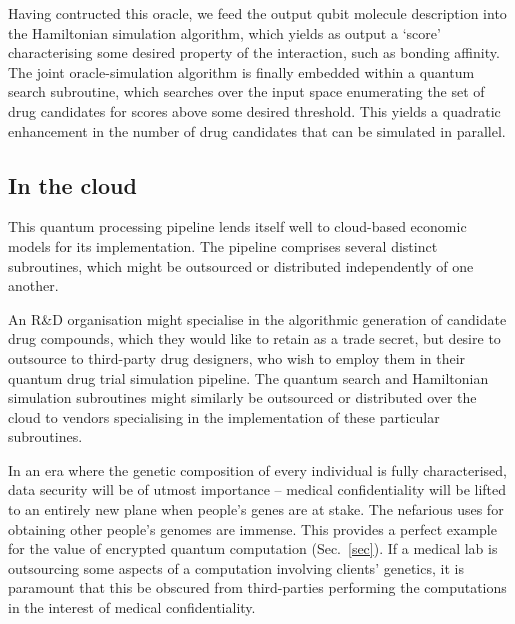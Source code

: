 \documentclass[aps,pra,twocolumn,amsmath,amssymb,nofootinbib,superscriptaddress]{revtex4}
\begin{document}
Having contructed this oracle, we feed the output qubit molecule description into the Hamiltonian simulation algorithm, which yields as output a `score' characterising some desired property of the interaction, such as bonding affinity. The joint oracle-simulation algorithm is finally embedded within a quantum search subroutine, which searches over the input space enumerating the set of drug candidates for scores above some desired threshold. This yields a quadratic enhancement in the number of drug candidates that can be simulated in parallel.

%
%

\subsection{In the cloud}

This quantum processing pipeline lends itself well to cloud-based economic models for its implementation. The pipeline comprises several distinct subroutines, which might be outsourced or distributed independently of one another.

An R\&D organisation might specialise in the algorithmic generation of candidate drug compounds, which they would like to retain as a trade secret, but desire to outsource to third-party drug designers, who wish to employ them in their quantum drug trial simulation pipeline. The quantum search and Hamiltonian simulation subroutines might similarly be outsourced or distributed over the cloud to vendors specialising in the implementation of these particular subroutines.

In an era where the genetic composition of every individual is fully characterised, data security will be of utmost importance -- medical confidentiality will be lifted to an entirely new plane when people's genes are at stake. The nefarious uses for obtaining other people's genomes are immense. This provides a perfect example for the value of encrypted quantum computation (Sec.~\ref{sec}). If a medical lab is outsourcing some aspects of a computation involving clients' genetics, it is paramount that this be obscured from third-parties performing the computations in the interest of medical confidentiality.  


\end{document}
